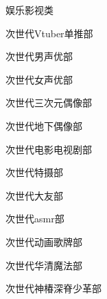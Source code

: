 \begin{multicols}{3}
    \begin{categorysection}{娱乐影视类}
        \item 次世代Vtuber单推部
        \item 次世代男声优部
        \item 次世代女声优部
        \item 次世代三次元偶像部
        \item 次世代地下偶像部
        \item 次世代电影电视剧部
        \item 次世代特摄部
        \item 次世代大友部
        \item 次世代asmr部
        \item 次世代动画歌牌部
        \item 次世代华清魔法部
        \item 次世代神椿深脊少革部
    \end{categorysection}


\end{multicols}
